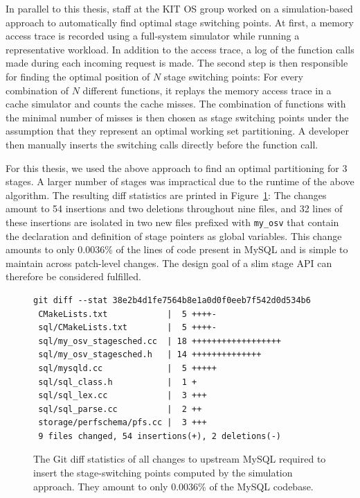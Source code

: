 \documentclass[12pt,a4paper]{book}
\begin{document}
In parallel to this thesis, staff at the KIT OS group worked on a simulation-based approach to automatically find optimal stage switching points.
At first, a memory access trace is recorded using a full-system simulator while running a representative workload.
In addition to the access trace, a log of the function calls made during each incoming request is made.
The second step is then responsible for finding the optimal position of $N$ stage switching points:
For every combination of $N$ different functions, it replays the memory access trace in a cache simulator and counts the cache misses.
The combination of functions with the minimal number of misses is then chosen as stage switching points under the assumption that they represent an optimal working set partitioning.
A developer then manually inserts the switching calls directly before the function call.~\cite{kitOSSFMA}

For this thesis, we used the above approach to find an optimal partitioning for 3 stages.
A larger number of stages was impractical due to the runtime of the above algorithm.
The resulting diff statistics are printed in Figure~\ref{fig:eval:api:diffstat}:
The changes amount to 54 insertions and two deletions throughout nine files, and 32 lines of these insertions are isolated in two new files prefixed with \texttt{my\_osv} that contain the declaration and definition of stage pointers as global variables.
This change amounts to only 0.0036\% of the lines of code present in MySQL and is simple to maintain across patch-level changes.
The design goal of a slim stage API can therefore be considered fulfilled.

\begin{figure}
\begin{lstlisting}[style=figurecpp]
git diff --stat 38e2b4d1fe7564b8e1a0d0f0eeb7f542d0d534b6
 CMakeLists.txt            |  5 ++++-
 sql/CMakeLists.txt        |  5 ++++-
 sql/my_osv_stagesched.cc  | 18 ++++++++++++++++++
 sql/my_osv_stagesched.h   | 14 ++++++++++++++
 sql/mysqld.cc             |  5 +++++
 sql/sql_class.h           |  1 +
 sql/sql_lex.cc            |  3 +++
 sql/sql_parse.cc          |  2 ++
 storage/perfschema/pfs.cc |  3 +++
 9 files changed, 54 insertions(+), 2 deletions(-)
\end{lstlisting}
\caption{The Git diff statistics of all changes to upstream MySQL required to insert the stage-switching points computed by the simulation approach.
    They amount to only 0.0036\% of the MySQL codebase.
}
\label{fig:eval:api:diffstat}
\end{figure}
\end{document}
